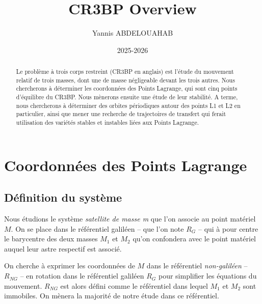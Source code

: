 \documentclass[12pt]{article}
\title{CR3BP Overview}
\author{Yannis ABDELOUAHAB}
\date{2025-2026}
\begin{document}
	\maketitle
	\tableofcontents
	
	\begin{abstract}
		Le problème à trois corps restreint (CR3BP en anglais) est l'étude du mouvement relatif de trois masses, dont une de masse négligeable devant les trois autres. Nous chercherons à déterminer les coordonnées des Points Lagrange, qui sont cinq points d'équilibre du CR3BP. Nous mènerons ensuite une étude de leur stabilité. A terme, nous chercherons à déterminer des orbites périodiques autour des points L1 et L2 en particulier, ainsi que mener une recherche de trajectoires de transfert qui ferait utilisation des variétés stables et instables liées aux Points Lagrange.
	\end{abstract}
	
	\section{Coordonnées des Points Lagrange}
	\subsection{Définition du système}
	Nous étudions le système \emph{satellite de masse m} que l'on associe au point matériel $M$. On se place dans le référentiel galiléen -- que l'on note $R_G$ -- qui à pour centre le barycentre des deux masses $M_1$ et $M_2$ qu'on confondera avec le point matériel auquel leur astre respectif est associé.
	
	On cherche à exprimer les coordonnées de $M$ dans le référentiel \textit{non-galiléen} -- $R_{NG}$ -- en rotation dans le référentiel galiléen $R_G$ pour simplifier les équations du mouvement. $R_{NG}$ est alors défini comme le référentiel dans lequel $M_1$ et $M_2$ sont immobiles. On mènera la majorité de notre étude dans ce référentiel.
	
\end{document}
